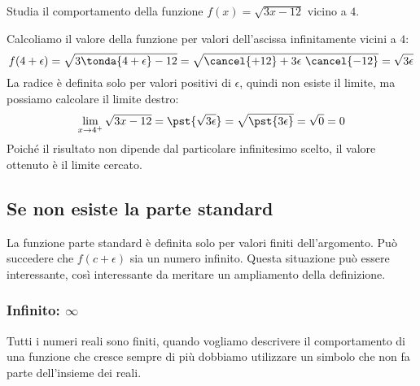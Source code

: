 \begin{esempio}
Studia il comportamento della funzione \(f(x)=\sqrt{3x-12}\) 
vicino a \(4\).


Calcoliamo il valore della funzione per valori dell'ascissa infinitamente 
vicini a \(4\):
\[f(4 + \epsilon) = \sqrt{3\tonda{4+\epsilon}-12} = 
\sqrt{\cancel{+12}+3 \epsilon~\cancel{-12}} = 
\sqrt{3 \epsilon}\]
La radice è definita solo per valori positivi di \(\epsilon\), quindi 
non esiste il limite, ma possiamo calcolare il limite destro:
\[\lim_{x \to 4^+}\sqrt{3x-12} = \pst{\sqrt{3 \epsilon}} = 
\sqrt{\pst{3 \epsilon}} = \sqrt{0} = 0\]
Poiché il risultato non dipende dal particolare infinitesimo scelto, il 
valore ottenuto è il limite cercato.
\end{esempio}

\subsection{Se non esiste la parte standard}
\label{subsec:cont_limiti_nonsempreesiste}

La funzione parte standard è definita solo per valori finiti 
dell'argomento.
Può succedere che \(f(c + \epsilon)\) sia un numero infinito. 
Questa situazione può essere interessante, così 
interessante da meritare un ampliamento della definizione.

\subsubsection{Infinito: \(\infty\)}

Tutti i numeri reali sono finiti, quando vogliamo descrivere il comportamento 
di una funzione che cresce sempre di più dobbiamo utilizzare un simbolo che 
non fa parte dell'insieme dei reali. 

